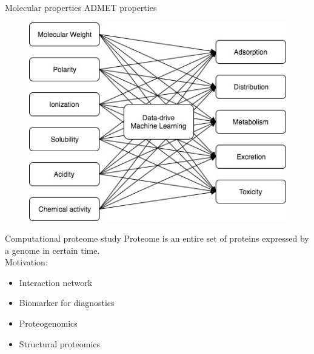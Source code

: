 \documentclass{beamer}
\begin{document}
\begin{frame}
Molecular properties \hfill ADMET properties
\begin{figure}
	\includegraphics[width=.9\linewidth]{Pics/MLDD.jpg}
\end{figure}
\end{frame}

\begin{frame}{Computational proteome study}
Proteome is an entire set of proteins expressed by a genome in certain time. \\
\vspace{1cm}
Motivation: 
\begin{itemize}
	\item Interaction network
	\item Biomarker for diagnostics
	\item Proteogenomics
	\item Structural proteomics
\end{itemize}

\end{frame}
\end{document}
